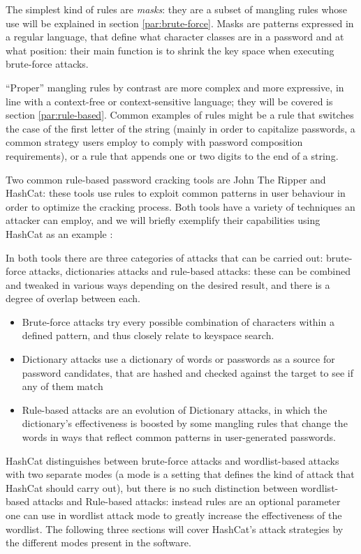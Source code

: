 The simplest kind of rules are \emph{masks}: they are a subset of mangling rules whose use will be explained in section \ref{par:brute-force}. Masks are patterns expressed in a regular language, that define what character classes are in a password and at what position: their main function is to shrink the key space when executing brute-force attacks.

\enquote{Proper} mangling rules by contrast are more complex and more expressive, in line with a context-free or context-sensitive language; they will be covered is section \ref{par:rule-based}.
Common examples of rules might be a rule that switches the case of the first letter of the string (mainly in order to capitalize passwords, a common strategy users employ to comply with password composition requirements), or a rule that appends one or two digits to the end of a string. 

Two common rule-based password cracking tools are John The Ripper and \break \mbox{HashCat}\cite{john,hash_cat}: these tools use rules to exploit common patterns in user behaviour in order to optimize the cracking process. Both tools have a variety of techniques an attacker can employ, and we will briefly exemplify their capabilities using HashCat as an example \cite{hash_cat_wiki}:

In both tools there are three categories of attacks that can be carried out: brute-force attacks, dictionaries attacks and rule-based attacks: these can be combined and tweaked in various ways depending on the desired result, and there is a degree of overlap between each.


\begin{itemize}
\item Brute-force attacks try every possible combination of characters within a defined pattern, and thus closely relate to keyspace search. 
\item Dictionary attacks use a dictionary of words or passwords as a source for password candidates, that are hashed and checked against the target to see if any of them match
\item Rule-based attacks are an evolution of Dictionary attacks, in which the dictionary's effectiveness is boosted by some mangling rules that change the words in ways that reflect common patterns in user-generated passwords.
\end{itemize}

HashCat distinguishes between brute-force attacks and wordlist-based attacks with two separate modes (a mode is a setting that defines the kind of attack that HashCat should carry out), but there is no such distinction between wordlist-based attacks and Rule-based attacks: instead rules are an optional parameter one can use in wordlist attack mode to greatly increase the effectiveness of the wordlist. The following three sections will cover HashCat's attack strategies by the different modes present in the software. 

